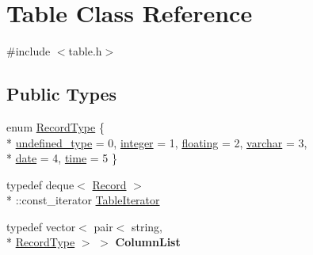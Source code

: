 \hypertarget{class_table}{\section{Table Class Reference}
\label{class_table}
}


{\ttfamily \#include $<$table.\-h$>$}

\subsection*{Public Types}
\begin{DoxyCompactItemize}
\item 
enum \hyperlink{class_table_af8f9ec96ecaa35a2e65312b74ddfeae6}{Record\-Type} \{ \\*
\hyperlink{class_table_af8f9ec96ecaa35a2e65312b74ddfeae6a0e9b8fc48315b1aa6736b0a6d1a5dd5c}{undefined\-\_\-type} = 0, 
\hyperlink{class_table_af8f9ec96ecaa35a2e65312b74ddfeae6a0739dd940ab69c758e43e1fd594f8500}{integer} = 1, 
\hyperlink{class_table_af8f9ec96ecaa35a2e65312b74ddfeae6adb56749fe0fd26f3af064ab8b1b695b7}{floating} = 2, 
\hyperlink{class_table_af8f9ec96ecaa35a2e65312b74ddfeae6aa112e11f34f9be73cb2be2b88f193ddb}{varchar} = 3, 
\\*
\hyperlink{class_table_af8f9ec96ecaa35a2e65312b74ddfeae6a31f82673442a5b478c44239c404d921c}{date} = 4, 
\hyperlink{class_table_af8f9ec96ecaa35a2e65312b74ddfeae6ab7605a19d0f66b3e1d92a8270bdbf34b}{time} = 5
 \}
\item 
typedef deque$<$ \hyperlink{class_record}{Record} $>$\\*
\-::const\-\_\-iterator \hyperlink{class_table_aa04536c6711fef7696862b4d94c077e9}{Table\-Iterator}
\item 
\hypertarget{class_table_a15f34139f21ca44eb608b16e5cc8bd75}{typedef vector$<$ pair$<$ string, \\*
\hyperlink{class_table_af8f9ec96ecaa35a2e65312b74ddfeae6}{Record\-Type} $>$ $>$ {\bfseries Column\-List}}\label{class_table_a15f34139f21ca44eb608b16e5cc8bd75}

\end{DoxyCompactItemize}
